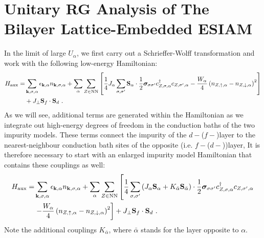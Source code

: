 \documentclass[%
reprint,
superscriptaddress,
groupedaddress,
superscriptaddress,
onecolumn,
10pt
]{revtex4-2}
\begin{document}

\section{Unitary RG Analysis of The Bilayer Lattice-Embedded ESIAM}
In the limit of large \(U_\alpha\), we first carry out a Schrieffer-Wolff transformation and work with the following low-energy Hamiltonian:
\begin{equation}\begin{aligned}
	H_\text{aux} =& \sum_{{\bf k},\sigma,\alpha}\epsilon_{{\bf k},\alpha}n_{{\bf k},\sigma,\alpha} + \sum_\alpha\sum_{Z \in \text{NN}}\left[\frac{1}{4}J_\alpha\sum_{\sigma,\sigma^\prime}{\bf S}_\alpha \cdot \frac{1}{2}{\boldsymbol{\sigma}}_{\sigma\sigma^\prime}c^\dagger_{Z,\sigma,\alpha}c_{Z,\sigma^\prime,\alpha} - \frac{W_\alpha}{4} \left(n_{Z,\uparrow,\alpha} - n_{Z,\downarrow,\alpha}\right)^2\right] \\
				 & + J_\perp {\bf S}_f \cdot {\bf S}_d~.
\end{aligned}\end{equation}
As we will see, additional terms are generated within the Hamiltonian as we integrate out high-energy degrees of freedom in the conduction baths of the two impurity models. These terms connect the impurity of the \(d-\)(\(f-\))layer to the nearest-neighbour conduction bath sites of the opposite (i.e. \(f-\)(\(d-\)))layer, It is therefore necessary to start with an enlarged impurity model Hamiltonian that contains these couplings as well:
\begin{equation}\begin{aligned}\label{expandedAux}
	H_\text{aux} =& \sum_{{\bf k},\sigma,\alpha}\epsilon_{{\bf k},\alpha}n_{{\bf k},\sigma,\alpha} + \sum_\alpha\sum_{Z \in \text{NN}}\left[\frac{1}{4}\sum_{\sigma,\sigma^\prime}\left(J_\alpha {\bf S}_\alpha + K_{\bar\alpha}{\bf S}_{\bar\alpha} \right)\cdot \frac{1}{2}{\boldsymbol{\sigma}}_{\sigma\sigma^\prime}c^\dagger_{Z,\sigma,\alpha}c_{Z,\sigma^\prime,\alpha} \right.\\
				 &\left. - \frac{W_\alpha}{4} \left(n_{Z,\uparrow,\alpha} - n_{Z,\downarrow,\alpha}\right)^2\right] + J_\perp{\bf S}_f \cdot {\bf S}_d~.
\end{aligned}\end{equation}
Note the additional couplings \(K_{\bar\alpha}\), where \(\bar\alpha\) stands for the layer opposite to \(\alpha\).
\end{document}
